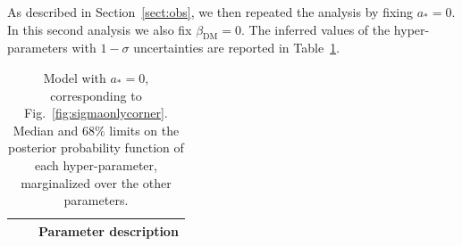 \documentclass[usenatbib]{mnras}
\def\Sref#1{Section~\ref{#1}\xspace}
\def\Fref#1{Fig.~\ref{#1}\xspace}
\def\Tref#1{Table~\ref{#1}\xspace}
\begin{document}
As described in \Sref{sect:obs}, we then repeated the analysis by fixing $a_*=0$. 
In this second analysis we also fix $\beta_{\mathrm{DM}}=0$.
The inferred values of the hyper-parameters with $1-\sigma$ uncertainties are reported in \Tref{tab:sigmaonlyhp}.
\begin{table}
 \caption{Model with $a_*=0$, corresponding to \Fref{fig:sigmaonlycorner}.  Median and $68\%$ limits on the posterior probability function of each hyper-parameter, marginalized over the other parameters.}
 \label{tab:sigmaonlyhp}
 \begin{tabular}{lcl}
 \hline
 & & Parameter description \\
 \hline
 
 \hline
 \end{tabular}
\end{table}
\end{document}
